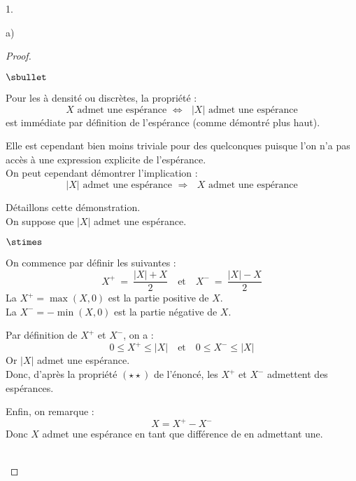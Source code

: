 \begin{noliste}{1.}
\begin{noliste}{a)}
\begin{proof}
      \begin{remark}
        \begin{noliste}{$\sbullet$}
	  \item Pour les \var à densité ou discrètes, la propriété :
	  \[
	    \text{$X$ admet une espérance \ $\Leftrightarrow$ \ $\vert 
	    X \vert$ admet une espérance}
	  \]
	  est immédiate par définition de l'espérance (comme 
	  démontré plus haut).
	  
	  \item Elle est cependant bien moins triviale pour des \var 
	  quelconques puisque l'on n'a pas accès à une expression 
	  explicite de l'espérance.\\
	  On peut cependant démontrer l'implication :
	  \[
	    \text{$\vert X \vert$ admet une espérance \ $\Rightarrow$ \ 
	    $X$ admet une espérance}
	  \]
        \item Détaillons cette démonstration.\\
          On suppose que $\vert X \vert$ admet une espérance.
	  \begin{noliste}{$\stimes$}
	    \item On commence par définir les \var suivantes :
	    \[
	      X^+ \ = \ \dfrac{\vert X \vert +X}{2} \quad \text{et} 
	      \quad X^- \ = \ \dfrac{\vert X \vert -X}{2}
	    \]
	    La \var $X^+=\max(X,0)$ est la partie positive de $X$.\\
	    La \var $X^-=-\min(X,0)$ est la partie négative de $X$.
	    
	    \item Par définition de $X^+$ et $X^-$, on a :
	    \[
	      0 \leq X^+ \leq \vert X \vert \quad \text{et} \quad 
	      0 \leq X^- \leq \vert X \vert
	    \]
	    Or $\vert X \vert$ admet une espérance.\\
	    Donc, d'après la propriété $(\star \star)$ de l'énoncé, les 
	    \var 
	    $X^+$ et 
	    $X^-$ admettent des espérances.
	    
	    \item Enfin, on remarque :
	    \[
	      X = X^+ - X^-
	    \]
	    Donc $X$ admet une espérance en tant que différence de \var 
	    en admettant une.
	  \end{noliste}
	\end{noliste}
      \end{remark}~\\[-1.4cm]
    \end{proof}
    
    
    \newpage
    

\end{noliste}
\end{noliste}

